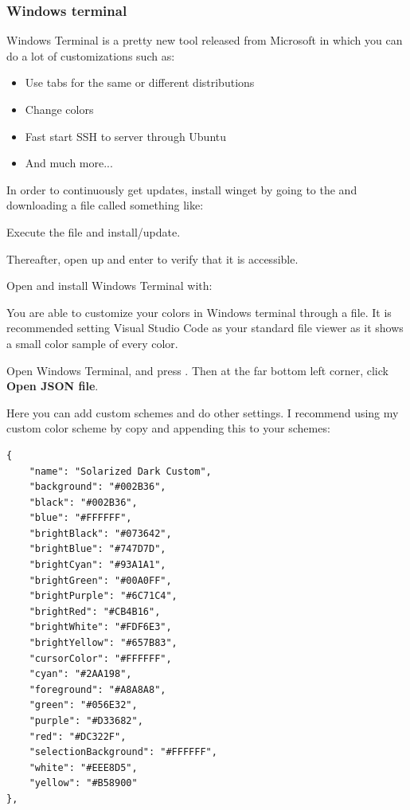 \subsubsection{Windows terminal}

Windows Terminal is a pretty new tool released from Microsoft in which you can do a lot of customizations such as:

\begin{itemize}
    \item Use tabs for the same or different distributions
    \item Change colors
    \item Fast start SSH to server through Ubuntu
    \item And much more...
\end{itemize}


In order to continuously get updates, install winget by going to the  and downloading a file called something like:


Execute the file and install/update.

Thereafter, open up  and enter  to verify that it is accessible.

Open  and install Windows Terminal with:



You are able to customize your colors in Windows terminal through a  file. It is recommended setting Visual Studio Code as your standard  file viewer as it shows a small color sample of every  color.

Open Windows Terminal, and press . Then at the far bottom left corner, click \textbf{Open JSON file}.

Here you can add custom schemes and do other settings. I recommend using my custom color scheme by copy and appending this to your schemes:

\begin{verbatim}
{
    "name": "Solarized Dark Custom",
    "background": "#002B36",
    "black": "#002B36",
    "blue": "#FFFFFF",
    "brightBlack": "#073642",
    "brightBlue": "#747D7D",
    "brightCyan": "#93A1A1",
    "brightGreen": "#00A0FF",
    "brightPurple": "#6C71C4",
    "brightRed": "#CB4B16",
    "brightWhite": "#FDF6E3",
    "brightYellow": "#657B83",
    "cursorColor": "#FFFFFF",
    "cyan": "#2AA198",
    "foreground": "#A8A8A8",
    "green": "#056E32",
    "purple": "#D33682",
    "red": "#DC322F",
    "selectionBackground": "#FFFFFF",
    "white": "#EEE8D5",
    "yellow": "#B58900" 
},
\end{verbatim}

